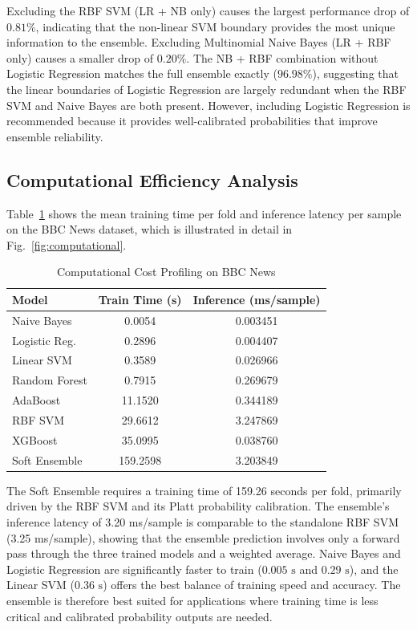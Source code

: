 \documentclass[conference]{IEEEtran}
\begin{document}
Excluding the RBF SVM (LR + NB only) causes the largest performance drop of $0.81\%$, indicating that the non-linear SVM boundary provides the most unique information to the ensemble. Excluding Multinomial Naive Bayes (LR + RBF only) causes a smaller drop of $0.20\%$. The NB + RBF combination without Logistic Regression matches the full ensemble exactly ($96.98\%$), suggesting that the linear boundaries of Logistic Regression are largely redundant when the RBF SVM and Naive Bayes are both present. However, including Logistic Regression is recommended because it provides well-calibrated probabilities that improve ensemble reliability.

\subsection{Computational Efficiency Analysis}

Table~\ref{tab:compute} shows the mean training time per fold and inference latency per sample on the BBC News dataset, which is illustrated in detail in Fig.~\ref{fig:computational}.

\begin{table}[htbp]
  \caption{Computational Cost Profiling on BBC News}
  \label{tab:compute}
  \centering
  \small
  \begin{tabular}{lcc}
    \toprule
    \textbf{Model} & \textbf{Train Time (s)} & \textbf{Inference (ms/sample)} \\
    \midrule
    Naive Bayes       & 0.0054  & 0.003451 \\
    Logistic Reg.     & 0.2896  & 0.004407 \\
    Linear SVM        & 0.3589  & 0.026966 \\
    Random Forest     & 0.7915  & 0.269679 \\
    AdaBoost          & 11.1520 & 0.344189 \\
    RBF SVM           & 29.6612 & 3.247869 \\
    XGBoost           & 35.0995 & 0.038760 \\
    Soft Ensemble     & 159.2598& 3.203849 \\
    \bottomrule
  \end{tabular}
\end{table}

The Soft Ensemble requires a training time of 159.26 seconds per fold, primarily driven by the RBF SVM and its Platt probability calibration. The ensemble's inference latency of 3.20 ms/sample is comparable to the standalone RBF SVM (3.25 ms/sample), showing that the ensemble prediction involves only a forward pass through the three trained models and a weighted average. Naive Bayes and Logistic Regression are significantly faster to train ($0.005\text{ s}$ and $0.29\text{ s}$), and the Linear SVM ($0.36\text{ s}$) offers the best balance of training speed and accuracy. The ensemble is therefore best suited for applications where training time is less critical and calibrated probability outputs are needed.
\end{document}
